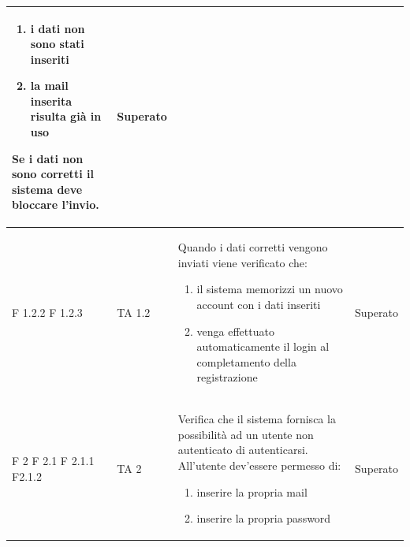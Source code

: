 \documentclass[a4paper,11pt]{article}
\begin{document}
\begin{longtable}{p{}p{}p{}p{}}
\begin{enumerate}
\item i dati non sono stati inseriti
\item la mail inserita risulta già in uso
\end{enumerate}
Se i dati non sono corretti il sistema deve bloccare l'invio. & Superato\\
\midrule

F 1.2.2 \newline F 1.2.3 & TA 1.2 & Quando i dati corretti vengono inviati viene verificato che:
\begin{enumerate}
\item il sistema memorizzi un nuovo account con i dati inseriti
\item venga effettuato automaticamente il login al completamento della registrazione
\end{enumerate}   & Superato\\

\midrule
F 2 \newline F 2.1 \newline F 2.1.1 \newline F2.1.2  & TA 2& Verifica che il sistema fornisca la possibilità ad un utente non autenticato di autenticarsi. All'utente dev'essere permesso di: 
\begin{enumerate}
\item inserire la propria mail
\item inserire la propria password
\end{enumerate} & Superato\\


\end{longtable}
\end{document}
